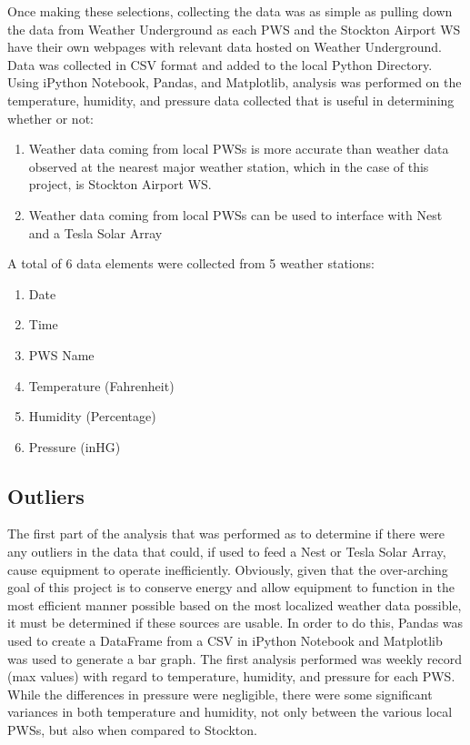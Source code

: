 \documentclass[sigconf]{acmart}
\begin{document}
Once making these selections, collecting the data was as simple as pulling down the data from Weather Underground as each PWS and the Stockton Airport WS have their own webpages with relevant data hosted on Weather Underground.\cite{WundergroundDeerRidge2017} Data was collected in CSV format and added to the local Python Directory. Using iPython Notebook, Pandas, and Matplotlib, analysis was performed on the temperature, humidity, and pressure data collected that is useful in determining whether or not:

\begin{enumerate}
    \item Weather data coming from local PWSs is more accurate than weather data observed at the nearest major weather station, which in the case of this project, is Stockton Airport WS.
    \item Weather data coming from local PWSs can be used to interface with Nest and a Tesla Solar Array
\end{enumerate}

A total of 6 data elements were collected from 5 weather stations:

\begin{enumerate}
    \item Date
    \item Time
    \item PWS Name
    \item Temperature (Fahrenheit)
    \item Humidity (Percentage)
    \item Pressure (inHG)
\end{enumerate}

\subsection{Outliers}

The first part of the analysis that was performed as to determine if there were any outliers in the data that could, if used to feed a Nest or Tesla Solar Array, cause equipment to operate inefficiently. Obviously, given that the over-arching goal of this project is to conserve energy and allow equipment to function in the most efficient manner possible based on the most localized weather data possible, it must be determined if these sources are usable. In order to do this, Pandas was used to create a DataFrame from a CSV in iPython Notebook and Matplotlib was used to generate a bar graph. The first analysis performed was weekly record (max values) with regard to temperature, humidity, and pressure for each PWS. While the differences in pressure were negligible, there were some significant variances in both temperature and humidity, not only between the various local PWSs, but also when compared to Stockton. 
\end{document}
